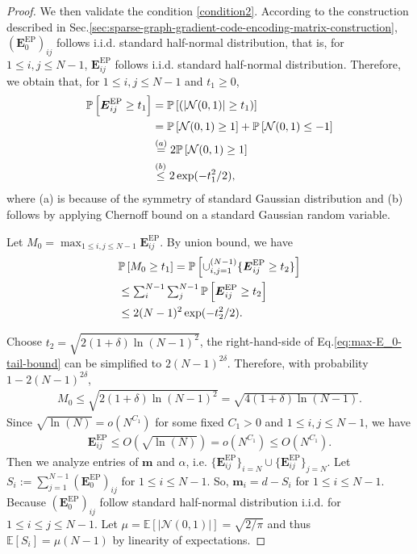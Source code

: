 \documentclass[lettersize,journal]{IEEEtran}
\newcommand{\GEP}{\boldsymbol{E}^{\mathrm{EP}}}
\newcommand{\gaussian}[2]{\mathcal{N}(#1, #2)}
\newcommand{\prob}[1]{\mathbb{P}\left[#1\right]}
\newcommand{\ex}[1]{\mathbb{E}\left[#1\right]}
\begin{document}
{\begin{proof}
We then validate the condition \ref{condition2}.
According to the construction described in Sec.\ref{sec:sparse-graph-gradient-code-encoding-matrix-construction}, $(\GEP_0)_{ij}$ follows i.i.d. standard half-normal distribution, that is, for $1\leq i, j\leq N-1$, $\GEP_{ij}$ follows i.i.d. standard half-normal distribution. Therefore, we obtain that, for $1\leq i, j\leq N-1$ and $t_1\geq 0$,
\begin{align}
    \prob{\GEP_{ij}\geq t_1}  &= \prob{(|\gaussian{0}{1}|\geq t_1)} \notag\\
    &= \prob{\gaussian{0}{1}\geq 1} + \prob{\gaussian{0}{1}\leq -1}\notag\\
    &\overset{(a)}{=} 2\prob{\gaussian{0}{1}\geq 1}\notag\\
    &\overset{(b)}{\leq} 2\exp(-t_1^2/2),\notag
\end{align}
where (a) is because of the symmetry of standard Gaussian distribution and (b) follows by applying Chernoff bound on a standard Gaussian random variable.

Let $M_0 = \max_{1\leq i, j\leq N-1}\GEP_{ij}$. By union bound, we have
\begin{align}
\label{eq:max-E_0-tail-bound}
    &\prob{M_0\geq t_1} = \prob{\cup^{(N-1)}_{i, j=1}\{\GEP_{ij}\geq t_2\}}\notag\\
    &\leq \textstyle\sum_{i}^{N-1} \sum_{j}^{N-1} \prob{\GEP_{ij}\geq t_2}\notag\\
    &\leq 2(N-1)^2\exp (-t_2^2/2).
\end{align}

Choose $t_2 = \sqrt{2(1+\delta)\ln(N-1)^2}$, the right-hand-side of Eq.\eqref{eq:max-E_0-tail-bound} can be simplified to $2(N-1)^{2\delta}$.
Therefore, with probability $1-2(N-1)^{2\delta}$,
\begin{align*}
    M_0\leq \sqrt{2(1+\delta)\ln(N-1)^2} = \sqrt{4(1+\delta)\ln(N-1)}.
\end{align*}
Since $\sqrt{\ln(N)}  = o(N^{C_1})$ for some fixed $C_1>0$ and $1\leq i, j\leq N-1$, we have
\begin{align}
\label{eq:scheduling-matrix-entries-poly-bounded}
    \GEP_{ij} \leq O(\sqrt{\ln(N)}) = o(N^{C_1}) \leq O(N^{C_1}).
\end{align}
Then we analyze entries of $\boldsymbol{m}$ and $\alpha$, i.e. $\{\GEP_{ij}\}_{i=N}\cup \{\GEP_{ij}\}_{j=N}$. Let $S_i:= \sum_{j=1}^{N-1}(\GEP_0)_{ij}$ for $1\leq i\leq N-1$. So, $\boldsymbol{m}_i = d-S_i$ for $1\leq i\leq N-1$.
Because $(\GEP_0)_{ij}$ follow standard half-normal distribution i.i.d. for $1\leq i\leq j\leq N-1$. Let $\mu = \ex{|\gaussian{0}{1}|} = \sqrt{2/\pi}$ and thus $\ex{S_i} = \mu(N-1)$ by linearity of expectations.


\end{proof}}
\end{document}

